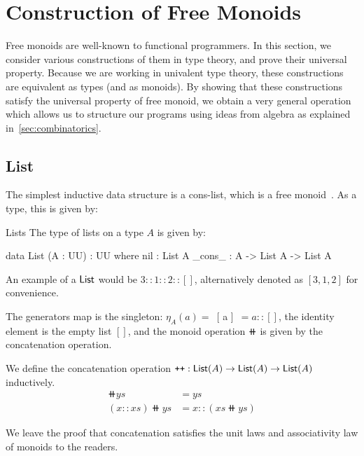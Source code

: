 \section{Construction of Free Monoids}
\label{sec:monoids}

Free monoids are well-known to functional programmers. In this section, we consider various constructions
of them in type theory, and prove their universal property. Because we are working in univalent type theory,
these constructions are equivalent as types (and as monoids). By showing that these constructions satisfy
the universal property of free monoid, we obtain a very general operation which allows us to structure our
programs using ideas from algebra as explained in~\ref{sec:combinatorics}.

\subsection{List}\label{mon:list}

The simplest inductive data structure is a cons-list, which is a free monoid~\cite{dubucFreeMonoids1974}. As a type, this is given by:

\begin{definition}{Lists}
The type of lists on a type $A$ is given by:
\begin{code}
data List (A : UU) : UU where
  nil : List A
  _cons_ : A -> List A -> List A
\end{code}
\end{definition}

An example of a $\operatorname{\mathsf{List}}$ would be $3 :: 1 :: 2 :: []$, alternatively denoted as $[3, 1, 2]$ for convenience.

The generators map is the singleton: $\eta_A(a) =$~[ a ]~$= a :: []$, 
the identity element is the empty list $[]$,
and the monoid operation $\doubleplus$ is given by the concatenation operation.

\begin{definition}[Concatenation]
We define the concatenation operation $\mathbin{\text{\ttfamily\upshape ++}} : \operatorname{\mathsf{List}}(A) \to \operatorname{\mathsf{List}}(A) \to \operatorname{\mathsf{List}}(A)$ inductively.
\begin{align*}
    [] \doubleplus ys & = ys \\
    (x :: xs) \doubleplus ys & = x :: (xs \doubleplus ys)
\end{align*}
\end{definition}

We leave the proof that concatenation satisfies the unit laws and associativity law of monoids to the readers.

